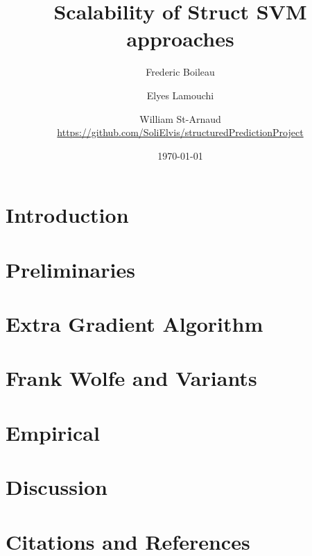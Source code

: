
\usepackage{graphicx} %
\graphicspath{{figures/}} %
\usepackage[
  backend=biber,
  citestyle=authoryear-ibid,
  natbib=true
  ]{biblatex}
\usepackage{csquotes}
\usepackage{comment}

\usepackage{fancyhdr}
\pagestyle{fancyplain}
\fancyhf{}
\rhead{ \fancyplain{}{\today} }
\rfoot{ \fancyplain{}{\thepage} }
\renewcommand\nameyeardelim{, }

\usepackage[toc,page]{appendix}



\title{Scalability of Struct SVM approaches}
\date{\today}
\author{Frederic Boileau \and Elyes Lamouchi \and William St-Arnaud \\
\url{https://github.com/SoliElvis/structuredPredictionProject}}

\maketitle

\clearpage
\tableofcontents
\clearpage
\section{Introduction}

% 

\clearpage
\section{Preliminaries}

% 

\clearpage
\section{Extra Gradient Algorithm}

\clearpage
\section{Frank Wolfe and Variants}

\clearpage


\clearpage
\section{Empirical}

% 

 \clearpage
\section{Discussion}


\clearpage
\section{Citations and References}
\printbibliography

\clearpage
\begin{appendices}

\clearpage

\clearpage

\clearpage
\end{appendices}

